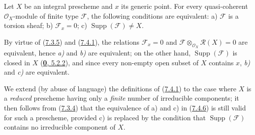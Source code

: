 \begin{proposition}[7.4.6]
\label{I.7.4.6}
Let $X$ be an integral prescheme and $x$ its generic point. For every
quasi-coherent $\mathscr{O}_X$-module of finite type $\mathscr{F}$, the
following conditions are equivalent: \textup{a)} $\mathscr{F}$ is a torsion sheaf;
\textup{b)} $\mathscr{F}_x=0$; \textup{c)}
$\operatorname{Supp}(\mathscr{F})\neq X$.
\end{proposition}

By virtue of (\hyperref[I.7.3.5]{7.3.5}) and
(\hyperref[I.7.4.1]{7.4.1}), the relations $\mathscr{F}_x=0$ and
$\mathscr{F}\otimes_{\mathscr{O}_X}\mathscr{R}(X)=0$ are equivalent, hence
\emph{a)} and \emph{b)} are equivalent; on the other hand,
$\operatorname{Supp}(\mathscr{F})$ is closed in $X$
(\hyperref[0.5.2.2]{\textbf{0}, 5.2.2}), and since every non-empty open subset of
$X$ contains $x$, \emph{b)} and \emph{c)} are equivalent.

\begin{env}[7.4.7]
\label{I.7.4.7}
We extend (by abuse of language) the definitions of
(\hyperref[I.7.4.1]{7.4.1}) to the case where $X$ is a
\emph{reduced} prescheme having only a \emph{finite} number of irreducible
components; it then follows from (\hyperref[I.7.3.4]{7.3.4}) that the
equivalence of a) and c) in (\hyperref[I.7.4.6]{7.4.6}) is still valid for
such a prescheme, provided c) is replaced by the condition that
$\operatorname{Supp}(\mathscr{F})$ contains no irreducible component of $X$.
\end{env}
